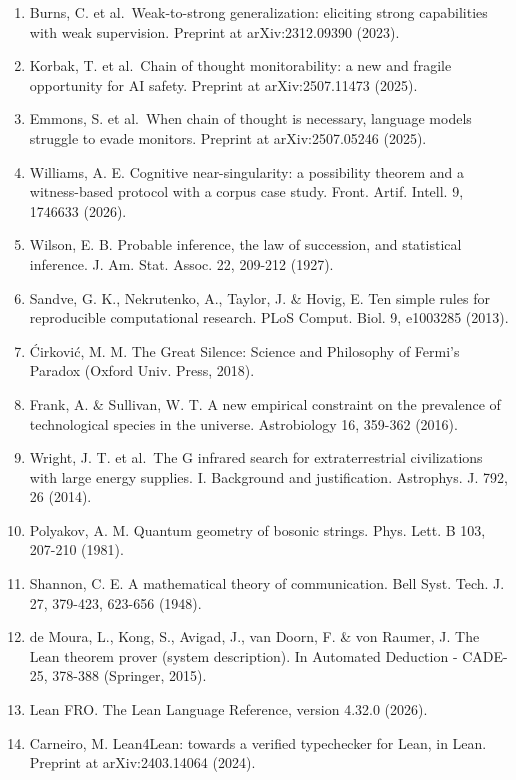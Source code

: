 \begin{enumerate}
  Preprint at arXiv:1805.00899 (2018).\\
\item
  Burns, C. et al.~Weak-to-strong generalization: eliciting strong
  capabilities with weak supervision. Preprint at arXiv:2312.09390
  (2023).\\
\item
  Korbak, T. et al.~Chain of thought monitorability: a new and fragile
  opportunity for AI safety. Preprint at arXiv:2507.11473 (2025).\\
\item
  Emmons, S. et al.~When chain of thought is necessary, language models
  struggle to evade monitors. Preprint at arXiv:2507.05246 (2025).\\
\item
  Williams, A. E. Cognitive near-singularity: a possibility theorem and
  a witness-based protocol with a corpus case study. Front. Artif.
  Intell. 9, 1746633 (2026).\\
\item
  Wilson, E. B. Probable inference, the law of succession, and
  statistical inference. J. Am. Stat. Assoc. 22, 209-212 (1927).\\
\item
  Sandve, G. K., Nekrutenko, A., Taylor, J. \& Hovig, E. Ten simple
  rules for reproducible computational research. PLoS Comput. Biol. 9,
  e1003285 (2013).\\
\item
  Ćirković, M. M. The Great Silence: Science and Philosophy of Fermi's
  Paradox (Oxford Univ. Press, 2018).\\
\item
  Frank, A. \& Sullivan, W. T. A new empirical constraint on the
  prevalence of technological species in the universe. Astrobiology 16,
  359-362 (2016).\\
\item
  Wright, J. T. et al.~The G infrared search for extraterrestrial
  civilizations with large energy supplies. I. Background and
  justification. Astrophys. J. 792, 26 (2014).\\
\item
  Polyakov, A. M. Quantum geometry of bosonic strings. Phys. Lett. B
  103, 207-210 (1981).\\
\item
  Shannon, C. E. A mathematical theory of communication. Bell Syst.
  Tech. J. 27, 379-423, 623-656 (1948).\\
\item
  de Moura, L., Kong, S., Avigad, J., van Doorn, F. \& von Raumer, J.
  The Lean theorem prover (system description). In Automated Deduction -
  CADE-25, 378-388 (Springer, 2015).\\
\item
  Lean FRO. The Lean Language Reference, version 4.32.0 (2026).\\
\item
  Carneiro, M. Lean4Lean: towards a verified typechecker for Lean, in
  Lean. Preprint at arXiv:2403.14064 (2024).
\end{enumerate}
